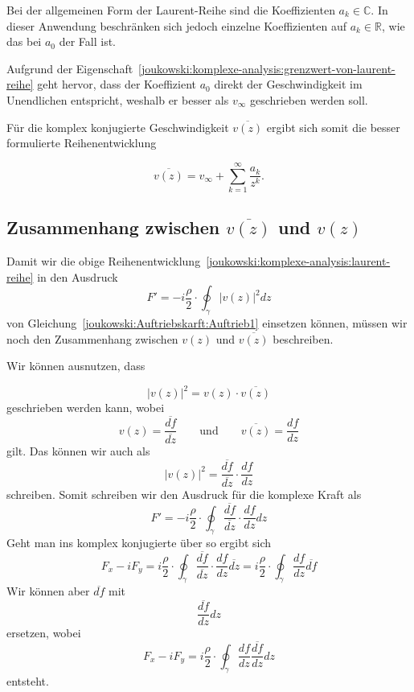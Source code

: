 Bei der allgemeinen Form der Laurent-Reihe sind die Koeffizienten $a_k \in \mathbb{C}$.
In dieser Anwendung beschränken sich jedoch einzelne Koeffizienten auf $a_k \in \mathbb{R}$, wie das bei $a_0$ der Fall ist.

Aufgrund der Eigenschaft~\eqref{joukowski:komplexe-analysis:grenzwert-von-laurent-reihe}
geht hervor, dass der Koeffizient $a_0$ direkt der Geschwindigkeit im Unendlichen entspricht, 
weshalb er besser als $v_\infty$ geschrieben werden soll.

Für die komplex konjugierte Geschwindigkeit $\overline{v(z)}$ ergibt sich somit die besser formulierte Reihenentwicklung

\begin{equation}
	\overline{v(z)}
	=
	v_\infty + \sum_{k=1}^{\infty} \frac{a_k}{z^k}.
	\label{joukowski:komplexe-analysis:laurent-reihe}
\end{equation}

\subsection{Zusammenhang zwischen $\overline{v(z)}$ und $v(z)$}

Damit wir die obige Reihenentwicklung~\eqref{joukowski:komplexe-analysis:laurent-reihe} in den Ausdruck
\[
	F'
	=
	-i \frac{\rho}{2} \cdot
	\displaystyle\oint_{\gamma}
	|v(z)|^2
	dz
\]
von Gleichung~\eqref{joukowski:Auftriebskarft:Auftrieb1} einsetzen können,
müssen wir noch den Zusammenhang zwischen $v(z)$ und $\overline{v(z)}$ beschreiben.

Wir können ausnutzen, dass

\[
	|v(z)|^2
	=
	v(z) \cdot \overline{v(z)}
\]
geschrieben werden kann,
wobei
\[
	v(z)
	=
	\frac{\overline{df}}{\overline{dz}}
	\qquad
	\text{und}
	\qquad
	\overline{v(z)}
	=
	\frac{df}{dz}
\]
gilt.
Das können wir auch als
\[
	|v(z)|^2
	=
	\frac{\overline{df}}{\overline{dz}}
	\cdot
	\frac{df}{dz}
\]
schreiben.
Somit schreiben wir den Ausdruck für die komplexe Kraft als
\[
	F'
	=
	-i \frac{\rho}{2} \cdot
	\displaystyle\oint_{\gamma}
	\frac{\overline{df}}{\overline{dz}}
	\cdot
	\frac{df}{dz}
	dz
\]
Geht man ins komplex konjugierte über so ergibt sich
\[
	F_x - i F_y
	=
	i \frac{\rho}{2} \cdot
	\displaystyle\oint_{\gamma}
	\frac{\overline{df}}{\overline{dz}}
	\cdot
	\frac{df}{dz}
	\overline{dz}
	=
	i \frac{\rho}{2} \cdot
	\displaystyle\oint_{\gamma}
	\frac{df}{dz}
	\overline{df}
\]
Wir können aber $\overline{df}$ mit
\[
\frac{\overline{df}}{dz} dz
\]
ersetzen, wobei
\begin{equation}
	F_x - i F_y
	=
	i \frac{\rho}{2} \cdot
	\displaystyle\oint_{\gamma}
	\frac{df}{dz}
	\frac{\overline{df}}{dz}
	dz
	\label{joukowski:komplexe-analysis:komplex-konjugierte-kraft}
\end{equation}
entsteht.

